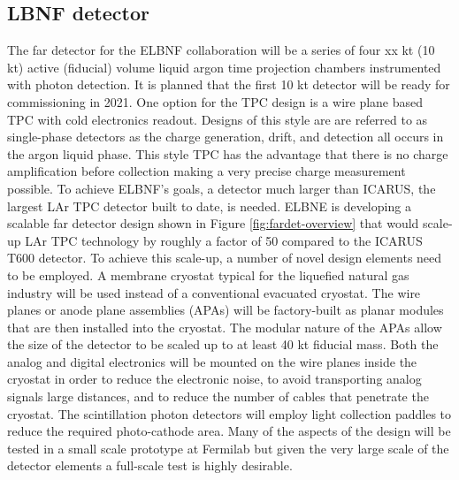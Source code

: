 
\subsection{LBNF detector}

The far detector for the ELBNF collaboration will be a series of four xx kt (10 kt) active (fiducial) volume  liquid argon time projection chambers instrumented with photon detection. It is planned that the first 10 kt detector will be ready for commissioning in 2021. One option for the TPC design is a wire plane based TPC with cold electronics readout. Designs of this style are are referred to as single-phase detectors as the charge generation, drift, and detection all occurs in the argon liquid phase. This style TPC has the advantage that there is no charge amplification before collection making a very precise charge measurement possible. To achieve ELBNF's goals, a detector much larger than ICARUS, the largest LAr TPC detector built to date, is needed. ELBNE is developing a scalable far detector design shown in Figure \ref{fig:fardet-overview} that would scale-up LAr TPC technology by roughly a factor of 50 compared to the ICARUS T600 detector. To achieve this scale-up, a number of novel design elements need to be employed. A membrane cryostat typical for the liquefied natural gas industry will be used instead of a conventional evacuated cryostat. The wire planes or anode plane assemblies (APAs) will be factory-built as planar modules that are then installed into the cryostat. The modular nature of the APAs allow the size of the detector to be scaled up to at least 40 kt fiducial mass. Both the analog and digital electronics will be mounted on the wire planes inside the cryostat in order to reduce the electronic noise, to avoid transporting analog signals large distances, and to reduce the number of cables that penetrate the cryostat. The scintillation photon detectors will employ light collection paddles to reduce the required photo-cathode area. Many of the aspects of the design will be tested in a small scale prototype at Fermilab but given the very large scale of the detector elements a full-scale test is highly desirable.



